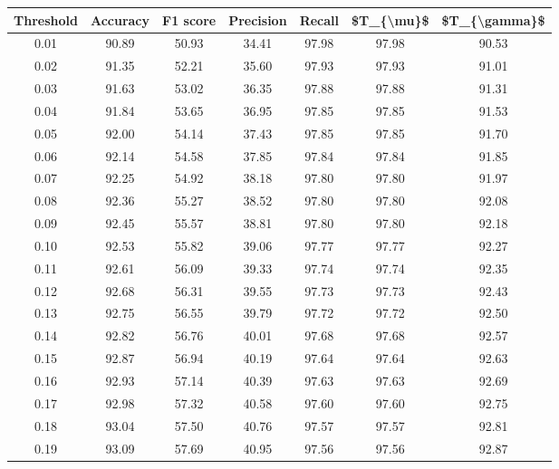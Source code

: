 \begin{tabular}{|c|c|c|c|c|c|c|}
\hline
 Threshold &  Accuracy &  F1 score &  Precision &  Recall &  \$T\_\{\textbackslash mu\}\$ &  \$T\_\{\textbackslash gamma\}\$ \\
\hline
      0.01 &     90.89 &     50.93 &      34.41 &   97.98 &      97.98 &         90.53 \\
      0.02 &     91.35 &     52.21 &      35.60 &   97.93 &      97.93 &         91.01 \\
      0.03 &     91.63 &     53.02 &      36.35 &   97.88 &      97.88 &         91.31 \\
      0.04 &     91.84 &     53.65 &      36.95 &   97.85 &      97.85 &         91.53 \\
      0.05 &     92.00 &     54.14 &      37.43 &   97.85 &      97.85 &         91.70 \\
      0.06 &     92.14 &     54.58 &      37.85 &   97.84 &      97.84 &         91.85 \\
      0.07 &     92.25 &     54.92 &      38.18 &   97.80 &      97.80 &         91.97 \\
      0.08 &     92.36 &     55.27 &      38.52 &   97.80 &      97.80 &         92.08 \\
      0.09 &     92.45 &     55.57 &      38.81 &   97.80 &      97.80 &         92.18 \\
      0.10 &     92.53 &     55.82 &      39.06 &   97.77 &      97.77 &         92.27 \\
      0.11 &     92.61 &     56.09 &      39.33 &   97.74 &      97.74 &         92.35 \\
      0.12 &     92.68 &     56.31 &      39.55 &   97.73 &      97.73 &         92.43 \\
      0.13 &     92.75 &     56.55 &      39.79 &   97.72 &      97.72 &         92.50 \\
      0.14 &     92.82 &     56.76 &      40.01 &   97.68 &      97.68 &         92.57 \\
      0.15 &     92.87 &     56.94 &      40.19 &   97.64 &      97.64 &         92.63 \\
      0.16 &     92.93 &     57.14 &      40.39 &   97.63 &      97.63 &         92.69 \\
      0.17 &     92.98 &     57.32 &      40.58 &   97.60 &      97.60 &         92.75 \\
      0.18 &     93.04 &     57.50 &      40.76 &   97.57 &      97.57 &         92.81 \\
      0.19 &     93.09 &     57.69 &      40.95 &   97.56 &      97.56 &         92.87 \\

\end{tabular}
